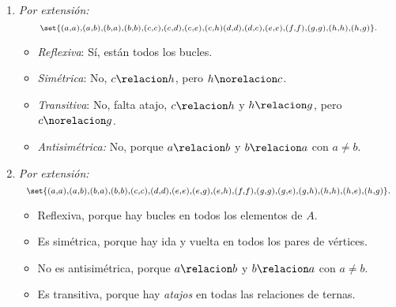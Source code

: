 \begin{enumerate}[label=\roman*)]
        \bigskip

  \item
        \begin{minipage}{0.25\textwidth}
          \diecinueveiii
        \end{minipage}
        \begin{minipage}{0.7\textwidth}
          \textit{Por extensión:}
          $$
            \scriptstyle
            \set{(a,a),(a,b),(b,a),(b,b),
              (c,c),(c,d),(c,e),(c,h)
              (d,d),(d,c), (e,e), (f,f), (g,g), (h,h),(h,g) }.
          $$
          \begin{itemize}
            \item \textit{Reflexiva}: Sí, están todos los bucles.
            \item \textit{Simétrica}: No, $c \relacion h$, pero $h \norelacion c$.
            \item \textit{Transitiva}: No, falta atajo, $c \relacion h$ y $h \relacion g$, pero $c \norelacion g$.
            \item \textit{Antisimétrica:} No, porque $a \relacion b$ y $b \relacion a$ con $a \neq b$.
          \end{itemize}
        \end{minipage}

        \bigskip

  \item
        \begin{minipage}{0.25\textwidth}
          \diecinueveiv
        \end{minipage}
        \begin{minipage}{0.7\textwidth}
          \textit{Por extensión:}
          $$
            \scriptstyle
            \set{(a,a),(a,b),(b,a),(b,b),(c,c),(d,d),
              (e,e),(e,g),(e,h),
              (f,f),
              (g,g),(g,e),(g,h),
              (h,h),(h,e),(h,g)
            }.
          $$
          \begin{itemize}
            \item Reflexiva, porque hay bucles en todos los elementos de $A$.
            \item Es simétrica, porque hay ida y vuelta en todos los pares de vértices.
            \item No es antisimétrica, porque $a \relacion b$ y $b \relacion a$ con $a \neq b$.
            \item Es transitiva, porque hay \textit{atajos} en todas las relaciones de ternas.
          \end{itemize}
        \end{minipage}
\end{enumerate}

\begin{aportes}
  \item {}
\end{aportes}
